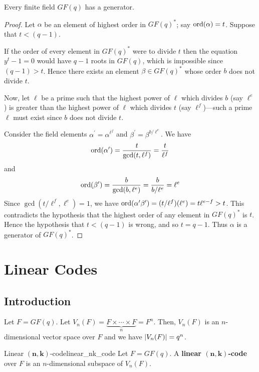 \begin{Theorem}{}{}
    Every finite field $ GF(q) $ has a generator.
\end{Theorem}

\begin{proof}
    Let $ \alpha $ be an element of highest order in $ GF(q)^* $;
    say $ \operatorname{ord}(\alpha)=t $. Suppose that $ t<(q-1) $.

    If the order of every element in $ GF(q)^* $ were to divide $ t $ then the equation
    $ y^t-1=0 $ would have $ q-1 $ roots in $ GF(q) $, which is impossible
    since $ (q-1)>t $. Hence there exists an element $ \beta\in GF(q)^* $
    whose order $ b $ does not divide $ t $.

    Now, let $ \ell $ be a prime such that the highest power of $ \ell $
    which divides $ b $ (say $ \ell^e $) is greater than the highest
    power of $ \ell $ which divides $ t $ (say $ \ell^f $)---such a prime
    $ \ell $ must exist since $ b $ does not divide $ t $.

    Consider the field elements $ \alpha^{\prime}=\alpha^{\ell^f} $
    and $ \beta^{\prime}=\beta^{b/\ell^e} $. We have
    \[ \operatorname{ord}(\alpha^{\prime})=\frac{t}{\gcd(t,\ell^f)} =\frac{t}{\ell^f} \]
    and
    \[ \operatorname{ord}(\beta^{\prime})=\frac{b}{\gcd(b,\ell^e)} =\frac{b}{b/\ell^e}=\ell^e \]
    Since $ \gcd(t/\ell^f,\ell^e)=1 $, we have $ \operatorname{ord}(\alpha^{\prime}\beta^{\prime})=
        (t/\ell^f)(\ell^e)=t\ell^{e-f}>t $. This contradicts the hypothesis
    that the highest order of any element in $ GF(q)^* $ is $ t $. Hence the
    hypothesis that $ t<(q-1) $ is wrong, and so $ t=q-1 $. Thus $ \alpha $
    is a generator of $ GF(q)^* $.
\end{proof}

\chapter{Linear Codes}
\section{Introduction}
Let $ F=GF(q) $. Let $ V_n(F)=\underbrace{F\times\cdots\times F}_{n}=F^n $.
Then, $ V_n(F) $ is an $ n $-dimensional vector space over $ F $ and
we have $ \lvert V_n(F)\rvert=q^n $.

\begin{Definition}{Linear $ \bm{(n,k)} $-code}{linear_nk_code}
    Let $ F=GF(q) $.
    A \textbf{linear $ \bm{(n,k)} $-code} over $ F $ is an $ n $-dimensional subspace
    of $ V_n(F) $.
\end{Definition}

